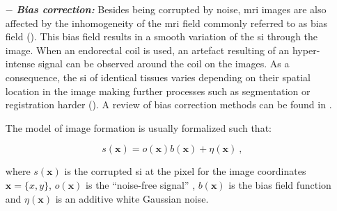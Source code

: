 \begin{enumerate}[leftmargin=*]
%
%

\item[$-$] \textbf{\textit{Bias correction:}} Besides being corrupted by noise, \ac{mri} images are also affected by the inhomogeneity of the \ac{mri} field commonly referred to as bias field (\cite{Styner2000}). This bias field results in a smooth variation of the \ac{si} through the image. When an endorectal coil is used, an artefact resulting of an hyper-intense signal can be observed around the coil on the images. As a consequence, the \ac{si} of identical tissues varies depending on their spatial location in the image making further processes such as segmentation or registration harder (\cite{Jungke1987,Vovk2007}). A review of bias correction methods can be found in \cite{Vovk2007}.

The model of image formation is usually formalized such that:

\begin{equation}
	s(\mathbf{x}) = o(\mathbf{x})b(\mathbf{x}) + \eta(\mathbf{x}) \ ,
	\label{eq:biasmodel}
\end{equation}

\noindent where $s(\mathbf{x})$ is the corrupted \ac{si} at the pixel for the image coordinates $\mathbf{x} = \{x,y\}$, $o(\mathbf{x})$ is the ``noise-free signal'' , $b(\mathbf{x})$ is the bias field function and $\eta(\mathbf{x})$ is an additive white Gaussian noise.
%
%
%


\end{enumerate}
